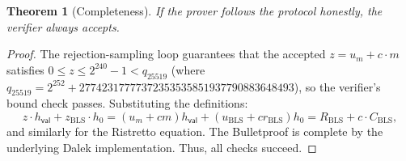 \documentclass[11pt]{article}
\theoremstyle{definitionstyle}
\newtheorem{theorem}{Theorem}[section]
\theoremstyle{plain}
\begin{document}
\begin{theorem}[Completeness]
If the prover follows the protocol honestly, the verifier always accepts.
\end{theorem}
\begin{proof}
The rejection-sampling loop guarantees that the accepted $z = u_m + c \cdot m$ satisfies $0 \le z \le 2^{240}-1 < q_{25519}$ (where $q_{25519} = 2^{252} + 27742317777372353535851937790883648493$), so the verifier's bound check passes. Substituting the definitions:
\[
z \cdot h_{\mathsf{val}} + z_{\text{BLS}} \cdot h_0 = (u_m + c m) h_{\mathsf{val}} + (u_{\text{BLS}} + c r_{\text{BLS}}) h_0 = R_{\text{BLS}} + c \cdot C_{\text{BLS}},
\]
and similarly for the Ristretto equation. The Bulletproof is complete by the underlying Dalek implementation. Thus, all checks succeed.
\end{proof}
\end{document}
